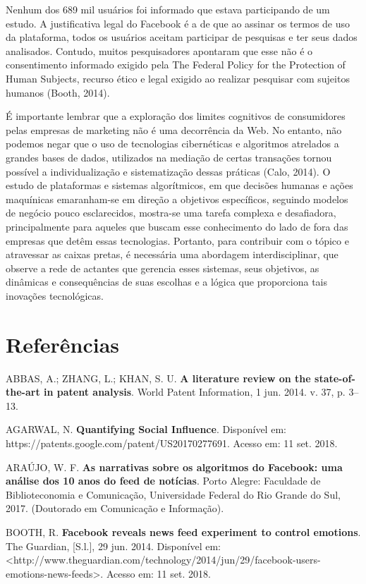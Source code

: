 Nenhum dos 689 mil usuários foi informado que estava participando de um
estudo. A justificativa legal do Facebook é a de que ao assinar os
termos de uso da plataforma, todos os usuários aceitam participar de
pesquisas e ter seus dados analisados. Contudo, muitos pesquisadores
apontaram que esse não é o consentimento informado exigido pela The
Federal Policy for the Protection of Human Subjects, recurso ético e
legal exigido ao realizar pesquisar com sujeitos humanos (Booth, 2014).

É importante lembrar que a exploração dos limites cognitivos de
consumidores pelas empresas de marketing não é uma decorrência da Web.
No entanto, não podemos negar que o uso de tecnologias cibernéticas e
algoritmos atrelados a grandes bases de dados, utilizados na mediação de
certas transações tornou possível a individualização e sistematização
dessas práticas (Calo, 2014). O estudo de plataformas e sistemas
algorítmicos, em que decisões humanas e ações maquínicas emaranham-se em
direção a objetivos específicos, seguindo modelos de negócio pouco
esclarecidos, mostra-se uma tarefa complexa e desafiadora,
principalmente para aqueles que buscam esse conhecimento do lado de fora
das empresas que detêm essas tecnologias. Portanto, para contribuir com
o tópico e atravessar as caixas pretas, é necessária uma abordagem
interdisciplinar, que observe a rede de actantes que gerencia esses
sistemas, seus objetivos, as dinâmicas e consequências de suas escolhas
e a lógica que proporciona tais inovações tecnológicas.

\section{Referências}

ABBAS, A.; ZHANG, L.; KHAN, S. U. \textbf{A literature review on the
state-of-the-art in patent analysis}. World Patent Information, 1 jun.
2014. v. 37, p. 3--13.

AGARWAL, N. \textbf{Quantifying Social Influence}. Disponível em:
https://patents.google.com/patent/US20170277691. Acesso em: 11 set.
2018.

ARAÚJO, W. F. \textbf{As narrativas sobre os algoritmos do Facebook: uma
análise dos 10 anos do feed de notícias}. Porto Alegre: Faculdade de
Biblioteconomia e Comunicação, Universidade Federal do Rio Grande do
Sul, 2017. (Doutorado em Comunicação e Informação).

BOOTH, R. \textbf{Facebook reveals news feed experiment to control
emotions}. The Guardian, {[}S.l.{]}, 29 jun. 2014. Disponível em:
\textless{}http://www.theguardian.com/technology/2014/jun/29/facebook-users-emotions-news-feeds\textgreater{}.
Acesso em: 11 set. 2018.

